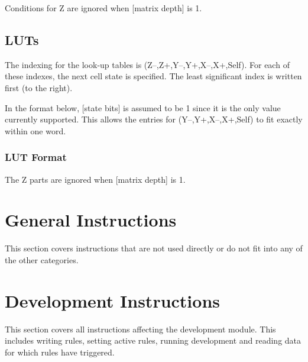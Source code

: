 \documentclass[a4paper,twoside,12pt]{article}
\begin{document}
Conditions for Z are ignored when [matrix depth] is 1.

\clearpage
\subsection{LUTs}

The indexing for the look-up tables is (Z–,Z+,Y–,Y+,X–,X+,Self).
For each of these indexes, the next cell state is specified.
The least significant index is written first (to the right).

In the format below, [state bits] is assumed to be 1 since it is the only value currently supported.
This allows the entries for (Y–,Y+,X–,X+,Self) to fit exactly within one word.

\subsubsection*{LUT Format}


\notes

The Z parts are ignored when [matrix depth] is 1.

\cleardoublepage
\section{General Instructions}

This section covers instructions that are not used directly or do not fit into any of the other categories.









\cleardoublepage
\section{Development Instructions}

This section covers all instructions affecting the development module.
This includes writing rules, setting active rules, running development and reading data for which rules have triggered.



\end{document}
